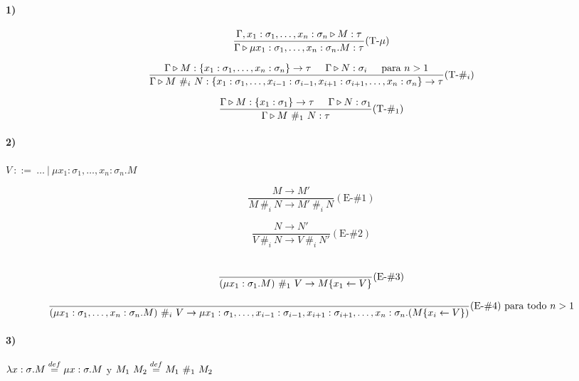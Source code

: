 \documentclass[10pt,a4paper, landscape]{article}
\begin{document}
\paragraph{1)}
\begin{multicols}{2}
$$\frac{\Gamma,x_1:\sigma_1,\dots,x_n:\sigma_n\triangleright M : \tau}{\Gamma\triangleright \mu x_1:\sigma_1,\dots,x_n:\sigma_n.M : \tau}(\text{T-}\mu)$$

\vspace*{5mm}
$$\frac{\Gamma\triangleright M : \{x_1:\sigma_1,\dots,x_n:\sigma_n\}\to\tau\hspace*{5mm}\Gamma\triangleright N : \sigma_i\hspace*{5mm}\text{para } n > 1}{\Gamma\triangleright M~\#_i~N : \{x_1:\sigma_1,\dots,x_{i-1}:\sigma_{i-1},x_{i+1}:\sigma_{i+1},\dots,x_n:\sigma_n\}\to\tau}(\text{T-}\#_i)$$

\vspace*{5mm}
$$\frac{\Gamma\triangleright M : \{x_1:\sigma_1\}\to\tau\hspace*{5mm}\Gamma\triangleright N : \sigma_1}{\Gamma\triangleright M~\#_1~N : \tau}(\text{T-}\#_1)$$
\end{multicols}

\vspace*{5mm}
\paragraph{2)} $V~::=~\dots~|~\mu x_1:\sigma_1,\dots,x_n:\sigma_n.M$
\begin{multicols}{2}
$$\frac{M\to M'}{M~\#_i~N \to M'~\#_i~N}(\text{E-}\#1)$$

\vspace*{5mm}
$$\frac{N\to N'}{V~\#_i~N \to V~\#_i~N'}(\text{E-}\#2)$$\

$$\frac{}{(\mu x_1:\sigma_1.M)~\#_1~V \to M\{x_1\leftarrow V\}}(\text{E-}\#3)$$
\vfill

\end{multicols}
\vspace*{5mm}
$$\frac{}{(\mu x_1:\sigma_1,\dots,x_n:\sigma_n.M)~\#_i~V \to \mu x_1:\sigma_1,\dots,x_{i-1}:\sigma_{i-1},x_{i+1}:\sigma_{i+1},\dots,x_n:\sigma_n.(M\{x_i\leftarrow V\})}(\text{E-}\#4) \text{ para todo } n > 1$$

\paragraph{3)} $\lambda x: \sigma \text{.} M\overset{def}{=} \mu x:\sigma.M$ y $M_1~M_2\overset{def}{=} M_1~\#_1~M_2$
\end{document}
